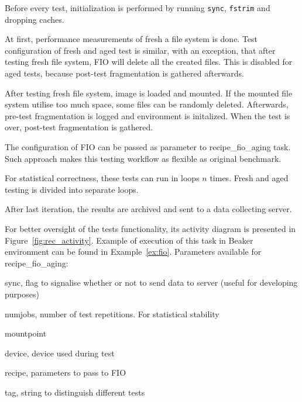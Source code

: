 \documentclass[
  color, %
  table, %
  lof,   %
  lot,   %
]{fithesis3}
\begin{document}
Before every test, initialization is performed by running \texttt{sync}, \texttt{fstrim} and dropping caches.

At first, performance measurements of fresh a file system is done. Test configuration of fresh and aged test is similar, with an exception, that after testing fresh file system, FIO will delete all the created files. This is disabled for aged tests, because post-test fragmentation is gathered afterwards.

After testing fresh file system, image is loaded and mounted. If the mounted file system utilise too much space, some files can be randomly deleted. Afterwards, pre-test fragmentation is logged and environment is initalized. When the test is over, post-test fragmentation is gathered.

The configuration of FIO can be passed as parameter to recipe\_fio\_aging task. Such approach makes this testing workflow as flexible as original benchmark.

For statistical correctness, these tests can run in loops $n$ times. Fresh and aged testing is divided into separate loops.

After last iteration, the results are archived and sent to a data collecting server. 

For better oversight of the tests functionality, its activity diagram is presented in Figure~\ref{fig:rec_activity}. Example of execution of this task in Beaker environment can be found in Example~\ref{ex:fio}. 
\clearpage
Parameters available for recipe\_fio\_aging:
\begin{compactenum}
  \item sync, flag to signalise whether or not to send data to server (useful for developing purposes)
  \item numjobs, number of test repetitions. For statistical stability
  \item mountpoint
  \item device, device used during test
  \item recipe, parameters to pass to FIO
  \item tag, string to distinguish different tests
  \end{compactenum}
\end{document}
